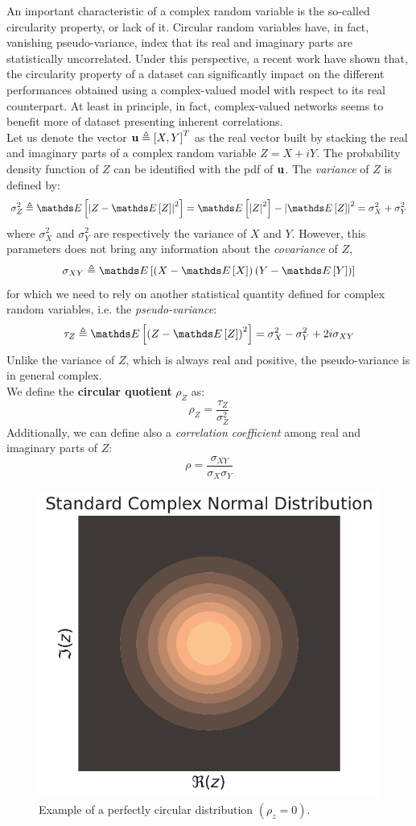 \documentclass[../main.tex]{subfiles}
\begin{document}
An important characteristic of a complex random
variable is the so-called circularity property, or lack of it. Circular random variables have, in fact, vanishing pseudo-variance, index that its real and imaginary parts are statistically uncorrelated. Under this perspective, a recent work \cite{barrachina2021complexvalued} have shown that, the circularity property of a dataset can significantly impact on the different performances obtained using a complex-valued model with respect to its real counterpart. At least in principle, in fact, complex-valued networks seems to benefit more of dataset presenting inherent correlations.\\
Let us denote the vector $\vb{u}\triangleq \left[X,Y\right]^T$ as the real vector built by stacking the real and imaginary parts of a complex random variable $Z = X+iY$. The probability density function of $Z$ can be identified with the pdf of $\vb{u}$. The \textit{variance} of $Z$ is defined by:
\[ \sigma^2_Z \triangleq \Ev{\abs{Z-\Ev{Z}}^2} = \Ev{\abs{Z}^2} - \abs{\Ev{Z}}^2 = \sigma^2_X + \sigma^2_Y \]
where $\sigma^2_X$ and $\sigma^2_Y$ are respectively the variance of $X$ and $Y$. However, this parameters does not bring any information about the \textit{covariance} of $Z$,
\[ \sigma_{XY} \triangleq \Ev{\left(X-\Ev{X}\right)\left(Y-\Ev{Y}\right)} \]
for which we need to rely on another statistical quantity defined for complex random variables, i.e. the \textit{pseudo-variance}:
\[ \tau_Z\triangleq \Ev{\left(Z-\Ev{Z}\right)^2} = \sigma^2_{X} - \sigma^2_Y + 2i\sigma_{XY} \]
Unlike the variance of $Z$, which is always real and positive, the pseudo-variance is in general complex.\\
We define the \textbf{circular quotient} $\rho_Z$ as:
\[ \rho_Z = \frac{\tau_Z}{\sigma^2_Z} \]
Additionally, we can define also a \textit{correlation coefficient} among real and imaginary parts of $Z$:
\[ \rho = \frac{\sigma_{XY}}{\sigma_X\sigma_Y} \]
\begin{figure}
	\centering
	\includegraphics[scale=0.5]{pictures/std_cmplx_norm_distrib}
	\caption{Example of a perfectly circular distribution $(\rho_z=0)$.}
	\label{fig:circular_distrib}
\end{figure} 
\end{document}
